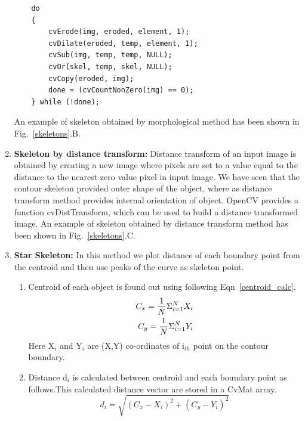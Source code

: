 \begin{enumerate}
\begin{lstlisting}
	do
	{
		cvErode(img, eroded, element, 1);
		cvDilate(eroded, temp, element, 1);
		cvSub(img, temp, temp, NULL);
		cvOr(skel, temp, skel, NULL);
		cvCopy(eroded, img);
		done = (cvCountNonZero(img) == 0);
	} while (!done);

\end{lstlisting}
\indent An example of skeleton obtained by morphological method has been
shown in Fig.~\ref{skeletons}.B.
\item \textbf{Skeleton by distance transform:} Distance transform of an
	input image is obtained by creating a new image where pixels are
	set to a value equal to the distance to the nearest zero value
	pixel in input image. We have seen that the contour skeleton
	provided outer shape of the object, where as distance transform
	method provides internal orientation of object. OpenCV provides
	a function cvDistTransform, which can be used to build a
	distance transformed image. An example of skeleton obtained by
	distance transform method has been shown in
	Fig.~\ref{skeletons}.C.
\item \textbf{Star Skeleton:} In this method we plot distance of each
	boundary point from the centroid and then use peaks of the curve
	as skeleton point.
\begin{enumerate}
\item Centroid of each object is found out using following
	Eqn~\ref{centroid_calc}.
	\begin{eqnarray}
	C_x = {1 \over N} \Sigma ^N _{i = 1} X_i \label{centroid_calc}
\nonumber \\
	C_y = {1 \over N} \Sigma ^N _{i = 1} Y_i 
	\end{eqnarray}
Here X$_i$ and Y$_i$ are (X,Y) co-ordinates of i$_{th}$ point on the contour
boundary.
\item Distance d$_i$ is calculated between centroid and each boundary
	point as follows.This calculated distance vector are stored in a
	CvMat array.
	\begin{equation}
	d_i = \sqrt{(C_x - X_i)^2 + (C_y - Y_i)^2} \label{dist_calc}
	\end{equation}


\end{enumerate}
\end{enumerate}
